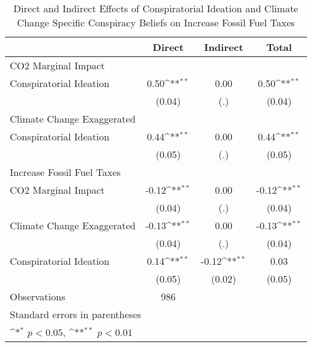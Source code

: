 \begin{table}[htbp]\centering
\def\sym#1{\ifmmode^{#1}\else\(^{#1}\)\fi}
\caption{Direct and Indirect Effects of Conspiratorial Ideation and Climate Change Specific Conspiracy Beliefs on Increase Fossil Fuel Taxes}
\begin{tabular}{l*{3}{c}}
\hline\hline
                    &\multicolumn{1}{c}{Direct}&\multicolumn{1}{c}{Indirect}&\multicolumn{1}{c}{Total}\\
\hline
CO2 Marginal Impact &                    &                    &                    \\
Conspiratorial Ideation&        0.50\sym{**}&        0.00        &        0.50\sym{**}\\
                    &      (0.04)        &         (.)        &      (0.04)        \\
\hline
Climate Change Exaggerated&                    &                    &                    \\
Conspiratorial Ideation&        0.44\sym{**}&        0.00        &        0.44\sym{**}\\
                    &      (0.05)        &         (.)        &      (0.05)        \\
\hline
Increase Fossil Fuel Taxes&                    &                    &                    \\
CO2 Marginal Impact &       -0.12\sym{**}&        0.00        &       -0.12\sym{**}\\
                    &      (0.04)        &         (.)        &      (0.04)        \\
[1em]
Climate Change Exaggerated&       -0.13\sym{**}&        0.00        &       -0.13\sym{**}\\
                    &      (0.04)        &         (.)        &      (0.04)        \\
[1em]
Conspiratorial Ideation&        0.14\sym{**}&       -0.12\sym{**}&        0.03        \\
                    &      (0.05)        &      (0.02)        &      (0.05)        \\
\hline
Observations        &         986        &                    &                    \\
\hline\hline
\multicolumn{4}{l}{\footnotesize Standard errors in parentheses}\\
\multicolumn{4}{l}{\footnotesize \sym{*} \(p<0.05\), \sym{**} \(p<0.01\)}\\
\end{tabular}
\end{table}
